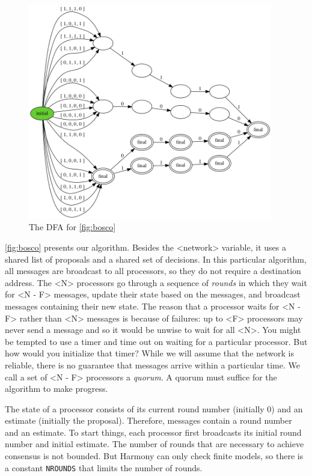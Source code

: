 \documentclass{report}
\begin{document}
\begin{figure}
\begin{center}
\includegraphics[width=0.95\textwidth]{figures/bosco.png}
\end{center}
\caption{The DFA for \autoref{fig:bosco}}
\label{fig:boscodfa}
\end{figure}

\autoref{fig:bosco} presents our algorithm.  Besides the <{network}>
variable,
it uses a shared list of proposals and a shared set of decisions.
In this particular algorithm, all messages are broadcast to all processors, so they do
not require a destination address.
The <{N}> processors go through a sequence of \emph{rounds} in which they wait for
<{N - F}> messages, update their state based on the messages, and
broadcast messages containing their new state.
The reason that a processor waits for <{N - F}> rather than <{N}>
messages is because of failures: up to <{F}> processors may never send a message
and so it would be unwise to wait for all <{N}>.  You might be tempted to use
a timer and time out on waiting for a particular processor.  But how would you initialize
that timer?  While we will assume that the network is reliable, there is no guarantee
that messages arrive within a particular time.
We call a set of <{N - F}> processors a \emph{quorum}.
A quorum must suffice for the algorithm to make progress.

The state of a processor consists of its current round number (initially 0)
and an estimate (initially the proposal).  Therefore, messages contain
a round number and an estimate. To start things, each processor first
broadcasts its initial round number and initial estimate.
The number of rounds that are necessary to achieve consensus is not bounded.  But
Harmony can only check finite models, so there is a constant \texttt{NROUNDS} that
limits the number of rounds.
\end{document}

